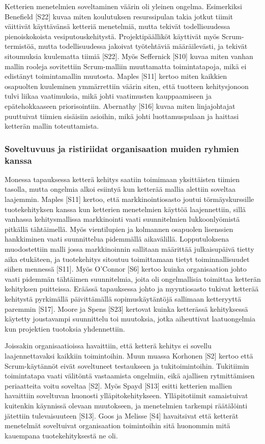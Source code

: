 Ketterien menetelmien soveltaminen väärin oli yleinen ongelma. Esimerkiksi
Benefield [S22] kuvaa miten koulutuksen resurssipulan takia jotkut tiimit
väittivät käyttävänsä ketteriä menetelmiä, mutta tekivät todellisuudessa
pienoiskokoista vesiputouskehitystä. Projektipäälliköt käyttivät myös
Scrum-termistöä, mutta todellisuudessa jakoivat työtehtäviä määräilevästi, ja
tekivät sitoumuksia kuulematta tiimiä [S22]. Myös Seffernick [S10] kuvaa miten
vanhan mallin rooleja sovitettiin Scrum-malliin muuttamatta toimintatapoja, mikä
ei edistänyt toimintamallin muutosta. Maples [S11] kertoo miten kaikkien
osapuolten kuuleminen ymmärrettiin väärin siten, että tuotteen kehitysjonoon
tulvi liikaa vaatimuksia, mikä johti vaatimusten kauppaamiseen ja
epätehokkaaseen priorisointiin. Abernathy [S16] kuvaa miten linjajohtajat
puuttuivat tiimien sisäisiin asioihin, mikä johti luottamuspulaan ja haittasi
ketterän mallin toteuttamista.

\subsubsection{Soveltuvuus ja ristiriidat organisaation muiden ryhmien kanssa}

Monessa tapauksessa ketterä kehitys saatiin toimimaan yksittäisten tiimien
tasolla, mutta ongelmia alkoi esiintyä kun ketterää mallia alettiin soveltaa
laajemmin. Maples [S11] kertoo, että markkinointiosasto joutui törmäyskurssille
tuotekehityksen kanssa kun ketterien menetelmien käyttöä laajennettiin, sillä
vanhassa kehitysmallissa markkinointi vaati suunnitelmien lukkoonlyömistä
pitkällä tähtäimellä. Myös vientilupien ja kolmannen osapuolen lisenssien
hankkiminen vaati suunnittelua pidemmällä aikavälillä. Lopputuloksena
muodostettiin malli jossa markkinoinnin sallitaan määrittää julkaisupäivä tietty
aika etukäteen, ja tuotekehitys sitoutuu toimittamaan tietyt toiminnallisuudet
siihen mennessä [S11]. Myös O'Connor [S6] kertoo kuinka organisaation johto
vaati pidemmän tähtäimen suunnitelmia, joita oli ongelmallisia toimittaa
ketterän kehityksen puitteissa. Eräässä tapauksessa johto ja myyntiosasto
tukivat ketterää kehitystä pyrkimällä päivittämällä sopimuskäytäntöjä sallimaan
ketteryyttä paremmin [S17]. Moore ja Spens [S23] kertovat kuinka ketterässä
kehityksessä käytetty joustavampi suunnittelu toi muutoksia, jotka aiheuttivat
laatuongelmia kun projektien tuotoksia yhdennettiin.

Joissakin organisaatioissa havaittiin, että ketterä kehitys ei sovellu
laajennettavaksi kaikkiin toimintoihin. Muun muassa Korhonen [S2] kertoo että
Scrum-käytännöt eivät soveltuneet testaukseen ja tukitoimintoihin. Tukitiimin
toimintatapa vaati välitöntä vastaamista ongelmiin, eikä ajallisen rytmittämisen
periaatteita voitu soveltaa [S2]. Myös Spayd [S13] esitti ketterien mallien
havaittiin soveltuvan huonosti ylläpitokehitykseen. Ylläpitotiimit samaistuivat
kuitenkin käynnissä olevaan muutokseen, ja menetelmien tarkempi räätälöinti
jätettiin tulevaisuuteen [S13]. Goos ja Melisse [S4] havaitsivat että ketterät
menetelmät soveltuivat organisaation toimintoihin sitä huonommin mitä kauempana
tuotekehityksestä ne oli.

